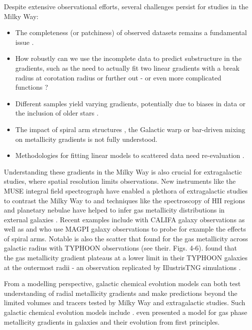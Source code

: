 \documentclass[fleqn,usenatbib]{mnras}
\begin{document}
Despite extensive observational efforts, several challenges persist for studies in the Milky Way:
\begin{itemize}
    \item The completeness (or patchiness) of observed datasets remains a fundamental issue \citep{Bergemann2014}.
    \item How robustly can we use the incomplete data to predict substructure in the gradients, such as the need to actually fit two linear gradients with a break radius at corotation radius \citep[][and references therein]{Bresolin2012} or further out \citep{Yong2012, Donor2020} - or even more complicated functions \citep[see e.g.][]{Chiappini2001, Kubryk2015}?
    \item Different samples yield varying gradients, potentially due to biases in data or the inclusion of older stars \citep[e.g.][]{Boeche2013, AllendePrieto2006, Katz2011, Hayden2014, Anders2014, Vickers2021, Willett2023}.
    \item The impact of spiral arm structures \citep{Poggio2021}, the Galactic warp \citep{Lemasle2022} or bar-driven mixing \citep{DiMatteo2013} on metallicity gradients is not fully understood.
    \item Methodologies for fitting linear models to scattered data need re-evaluation \citep{Metha2021}.
\end{itemize}

Understanding these gradients in the Milky Way is also crucial for extragalactic studies, where spatial resolution limits observations. New instruments like the MUSE integral field spectrograph have enabled a plethora of extragalactic studies to contrast the Milky Way to and techniques like the spectroscopy of HII regions and planetary nebulae have helped to infer gas metallicity distributions in external galaxies \citep{Shaver1983, Vilchez1996, Rolleston2000, Bresolin2012}. Recent examples include \citet{Sanchez2014} with CALIFA galaxy observations as well as \citet{Mun2024} and \citet{Chen2024} who use MAGPI galaxy observations to probe for example the effects of spiral arms. Notable is also the scatter that \citet{Chen2023} found for the gas metallicity across galactic radius with TYPHOON observations (see their. Figs. 4-6). \citet{Grasha2022} found that the gas metallicity gradient plateaus at a lower limit in their TYPHOON galaxies at the outermost radii - an observation replicated by IllustrisTNG simulations \citep{Hemler2021, Garcia2023}.

From a modelling perspective, galactic chemical evolution models can both test understanding of radial metallicity gradients and make predictions beyond the limited volumes and tracers tested by Milky Way and extragalactic studies. Such galactic chemical evolution models include \citet{Chiappini2001, Matteucci2001b, Minchev2014b, Kubryk2015, Stanghellini2015, Rybizki2017}. \citet{Sharda2021} even presented a model for gas phase metallicity gradients in galaxies and their evolution from first principles. 
\end{document}
